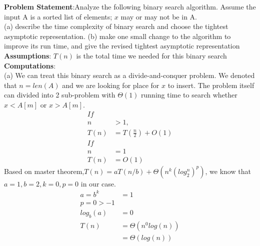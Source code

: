 \documentclass[12pt]{article}
\newenvironment{proposition}[2][Proposition]{\begin{trivlist}
\item[\hskip \labelsep {\bfseries #1}\hskip \labelsep {\bfseries #2.}]}{\end{trivlist}}
\begin{document}
 
\begin{proposition}{2}
\end{proposition}
\setlength{\parindent}{0pt}
\textbf{Problem Statement}:Analyze the following binary search algorithm. Assume the input A is a sorted list of elements; $x$ may or may not be in A. \\
(a) describe the time complexity of binary search and choose the tightest asymptotic representation.
(b) make one small change to the algorithm to improve its run time, and give the revised tightest asymptotic representation \\
\textbf{Assumptions}: $T(n)$ is the total time we needed for this binary search\\
\textbf{Computations}: \\
(a) We can treat this binary search as a divide-and-conquer problem. We denoted that $n=len(A)$ and we are looking for place for $x$ to insert. The problem itself can divided into 2 sub-problem with $\Theta(1)$ running time to search whether $x < A[m]$ or $x > A[m]$.
\begin{align*}
    If \\
    n &> 1, \\
    T(n) &= T(\frac{n}{2}) + O(1) \\
    If \\
    n &= 1 \\
    T(n) &= O(1)
\end{align*}
Based on master theorem,$T(n) = aT(n/b) + \Theta(n^k (log_2^n)^p)$, we know that $a = 1, b = 2, k=0, p=0$ in our case.
\begin{align*}
    a = b^k &= 1 \\
    p = 0 > -1 \\
    log_b(a) &= 0 \\
    T(n) &= \Theta (n^0 log(n)) \\
    & = \Theta(log(n))
\end{align*} \\
\end{document}
